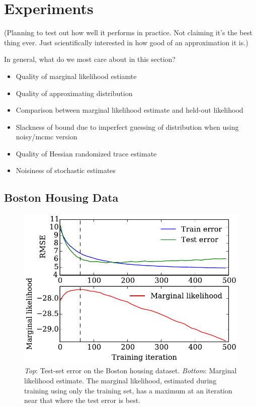 \documentclass[]{article}
\begin{document}
\section{Experiments}

(Planning to test out how well it performs in practice. Not claiming it's the
best thing ever. Just scientifically interested in how good of an approximation
it is.)

In general, what do we most care about in this section?
\begin{itemize}
\item Quality of marginal likelihood estiamte
\item Quality of approximating distribution
\item Comparison between marginal likelihood estimate and held-out likelihood
\item Slackness of bound due to imperfect guessing of distribution when using
  noisy/mcmc version
\item Quality of Hessian randomized trace estimate
\item Noisiness of stochastic estimates
\end{itemize}

\subsection{Boston Housing Data}


\begin{figure}[t]
\begin{center}
\includegraphics[width=\columnwidth]{../experiments/2015_03_01_housing/1/marglik}
\vskip -0.1in
\caption{\emph{Top}: Test-set error on the Boston housing dataset.
\emph{Bottom}: Marginal likelihood estimate.
The marginal likelihood, estimated during training using only the training set, has a maximum at an iteration near that where the test error is best.}
\label{fig:housing}
\end{center}
\end{figure}
\end{document}
